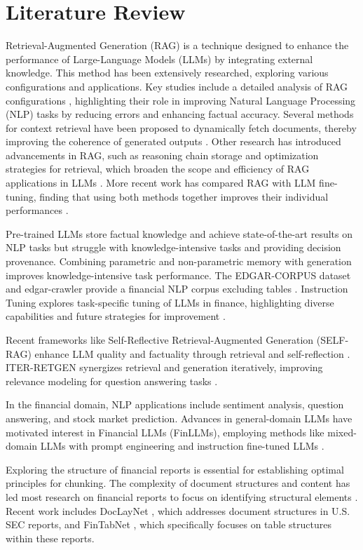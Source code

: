 \section{Literature Review}
Retrieval-Augmented Generation (RAG) is a technique designed to enhance the performance of Large-Language Models (LLMs) by integrating external knowledge. This method has been extensively researched, exploring various configurations and applications. Key studies include a detailed analysis of RAG configurations \cite{Gao.18Dec2023}, highlighting their role in improving Natural Language Processing (NLP) tasks by reducing errors and enhancing factual accuracy. Several methods for context retrieval have been proposed to dynamically fetch documents, thereby improving the coherence of generated outputs \cite{Anantha.10Dec2023}. Other research has introduced advancements in RAG, such as reasoning chain storage and optimization strategies for retrieval, which broaden the scope and efficiency of RAG applications in LLMs \cite{Lewis.22May2020}. More recent work has compared RAG with LLM fine-tuning, finding that using both methods together improves their individual performances \cite{Balaguer.16Jan2024}.

Pre-trained LLMs store factual knowledge and achieve state-of-the-art results on NLP tasks but struggle with knowledge-intensive tasks and providing decision provenance. Combining parametric and non-parametric memory with generation improves knowledge-intensive task performance\cite{Lewis.22May2020}. The EDGAR-CORPUS dataset and edgar-crawler provide a financial NLP corpus excluding tables \cite{Loukas.2021}. Instruction Tuning explores task-specific tuning of LLMs in finance, highlighting diverse capabilities and future strategies for improvement \cite{Wang.31Dec2023}.

Recent frameworks like Self-Reflective Retrieval-Augmented Generation (SELF-RAG) enhance LLM quality and factuality through retrieval and self-reflection \cite{Asai.17Oct2023}. ITER-RETGEN synergizes retrieval and generation iteratively, improving relevance modeling for question answering tasks \cite{Shao.24May2023}.

In the financial domain, NLP applications include sentiment analysis, question answering, and stock market prediction. Advances in general-domain LLMs have motivated interest in Financial LLMs (FinLLMs), employing methods like mixed-domain LLMs with prompt engineering and instruction fine-tuned LLMs \cite{Lee.4Feb2024}.

Exploring the structure of financial reports is essential for establishing optimal principles for chunking. The complexity of document structures and content has led most research on financial reports to focus on identifying structural elements \cite{Yepes.5Feb2024}. Recent work includes DocLayNet \cite{Pfitzmann.2022}, which addresses document structures in U.S. SEC reports, and FinTabNet \cite{Zheng.}, which specifically focuses on table structures within these reports.

